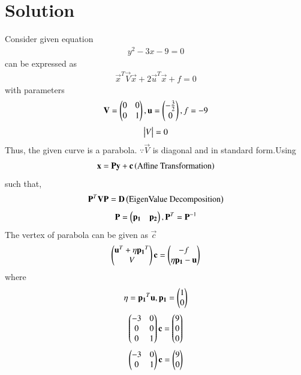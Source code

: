 \documentclass[journal,12pt,twocolumn]{IEEEtran}
\begin{document}
\section{Solution}
Consider given equation
\begin{align}
y^{2}-3x-9=0\label{b1}
\end{align}
 can be expressed as
\begin{align}
\vec{x}^{T}\vec{V}\vec{x}+2\vec{u}^{T}\vec{x}+f=0
\end{align}
with parameters
\begin{align}
\mathbf{V}=\begin{pmatrix}0&0\\0&1\end{pmatrix}, \mathbf{u}=\begin{pmatrix}-\frac{3}{2}\\0\end{pmatrix}, f=-9
\end{align}
\begin{align}
\begin{vmatrix}V\end{vmatrix}=0
\end{align}
Thus, the given curve is a parabola.  $\because \vec{V}$ is diagonal and in standard form.Using
\begin{align}
\mathbf{x}=\mathbf{P}\mathbf{y}+\mathbf{c}   \left(\text{Affine Transformation}\right)\label{af}
\end{align}
such that,
\begin{align}
\mathbf{P}^{T}\mathbf{V}\mathbf{P}=\mathbf{D}  \left(\text{EigenValue Decomposition}\right)
\end{align}
\begin{align}
\mathbf{P}=\begin{pmatrix}\mathbf{p_1} & \mathbf{p_2}\end{pmatrix} , \mathbf{P}^{T}=\mathbf{P}^{-1}\label{in}
\end{align}
The vertex of parabola can be given as $\vec{c}$
\begin{align}
    \begin{pmatrix}\mathbf{u}^{T}+\eta \mathbf{p_1}^{T}\\V\end{pmatrix}\mathbf{c}=\begin{pmatrix}-f\\\eta \mathbf{p_1}-\mathbf{u}\end{pmatrix}
\end{align}
where 
\begin{align}
    \eta=\mathbf{p_1}^{T}\mathbf{u}, \mathbf{p_1}=\begin{pmatrix}1\\0\end{pmatrix}
\end{align}
\begin{align}
    \begin{pmatrix}-3&0\\0&0\\0&1\end{pmatrix}\mathbf{c}=\begin{pmatrix}9\\0\\0\end{pmatrix}
\end{align}
\begin{align}
    \begin{pmatrix}-3&0\\0&1\end{pmatrix}\mathbf{c}=\begin{pmatrix}9\\0\end{pmatrix} 
\end{align}
\end{document}
